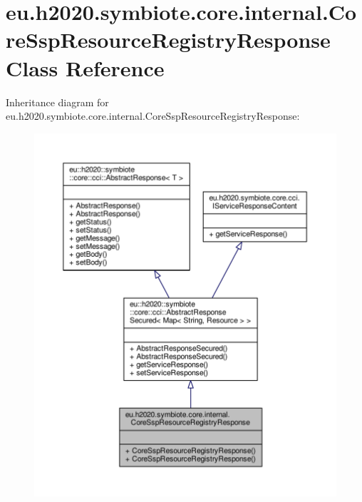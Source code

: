 \hypertarget{classeu_1_1h2020_1_1symbiote_1_1core_1_1internal_1_1CoreSspResourceRegistryResponse}{}\section{eu.\+h2020.\+symbiote.\+core.\+internal.\+Core\+Ssp\+Resource\+Registry\+Response Class Reference}
\label{classeu_1_1h2020_1_1symbiote_1_1core_1_1internal_1_1CoreSspResourceRegistryResponse}


Inheritance diagram for eu.\+h2020.\+symbiote.\+core.\+internal.\+Core\+Ssp\+Resource\+Registry\+Response\+:
\nopagebreak
\begin{figure}[H]
\begin{center}
\leavevmode
\includegraphics[width=350pt]{classeu_1_1h2020_1_1symbiote_1_1core_1_1internal_1_1CoreSspResourceRegistryResponse__inherit__graph}
\end{center}
\end{figure}


